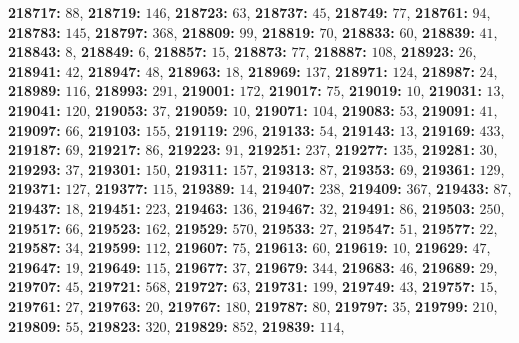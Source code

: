 \textsf{\bfseries 218717:} $88$, \textsf{\bfseries 218719:} $146$, \textsf{\bfseries 218723:} $63$, \textsf{\bfseries 218737:} $45$, \textsf{\bfseries 218749:} $77$, \textsf{\bfseries 218761:} $94$, \textsf{\bfseries 218783:} $145$, \textsf{\bfseries 218797:} $368$, \textsf{\bfseries 218809:} $99$, \textsf{\bfseries 218819:} $70$, \textsf{\bfseries 218833:} $60$, \textsf{\bfseries 218839:} $41$, \textsf{\bfseries 218843:} $8$, \textsf{\bfseries 218849:} $6$, \textsf{\bfseries 218857:} $15$, \textsf{\bfseries 218873:} $77$, \textsf{\bfseries 218887:} $108$, \textsf{\bfseries 218923:} $26$, \textsf{\bfseries 218941:} $42$, \textsf{\bfseries 218947:} $48$, \textsf{\bfseries 218963:} $18$, \textsf{\bfseries 218969:} $137$, \textsf{\bfseries 218971:} $124$, \textsf{\bfseries 218987:} $24$, \textsf{\bfseries 218989:} $116$, \textsf{\bfseries 218993:} $291$, \textsf{\bfseries 219001:} $172$, \textsf{\bfseries 219017:} $75$, \textsf{\bfseries 219019:} $10$, \textsf{\bfseries 219031:} $13$, \textsf{\bfseries 219041:} $120$, \textsf{\bfseries 219053:} $37$, \textsf{\bfseries 219059:} $10$, \textsf{\bfseries 219071:} $104$, \textsf{\bfseries 219083:} $53$, \textsf{\bfseries 219091:} $41$, \textsf{\bfseries 219097:} $66$, \textsf{\bfseries 219103:} $155$, \textsf{\bfseries 219119:} $296$, \textsf{\bfseries 219133:} $54$, \textsf{\bfseries 219143:} $13$, \textsf{\bfseries 219169:} $433$, \textsf{\bfseries 219187:} $69$, \textsf{\bfseries 219217:} $86$, \textsf{\bfseries 219223:} $91$, \textsf{\bfseries 219251:} $237$, \textsf{\bfseries 219277:} $135$, \textsf{\bfseries 219281:} $30$, \textsf{\bfseries 219293:} $37$, \textsf{\bfseries 219301:} $150$, \textsf{\bfseries 219311:} $157$, \textsf{\bfseries 219313:} $87$, \textsf{\bfseries 219353:} $69$, \textsf{\bfseries 219361:} $129$, \textsf{\bfseries 219371:} $127$, \textsf{\bfseries 219377:} $115$, \textsf{\bfseries 219389:} $14$, \textsf{\bfseries 219407:} $238$, \textsf{\bfseries 219409:} $367$, \textsf{\bfseries 219433:} $87$, \textsf{\bfseries 219437:} $18$, \textsf{\bfseries 219451:} $223$, \textsf{\bfseries 219463:} $136$, \textsf{\bfseries 219467:} $32$, \textsf{\bfseries 219491:} $86$, \textsf{\bfseries 219503:} $250$, \textsf{\bfseries 219517:} $66$, \textsf{\bfseries 219523:} $162$, \textsf{\bfseries 219529:} $570$, \textsf{\bfseries 219533:} $27$, \textsf{\bfseries 219547:} $51$, \textsf{\bfseries 219577:} $22$, \textsf{\bfseries 219587:} $34$, \textsf{\bfseries 219599:} $112$, \textsf{\bfseries 219607:} $75$, \textsf{\bfseries 219613:} $60$, \textsf{\bfseries 219619:} $10$, \textsf{\bfseries 219629:} $47$, \textsf{\bfseries 219647:} $19$, \textsf{\bfseries 219649:} $115$, \textsf{\bfseries 219677:} $37$, \textsf{\bfseries 219679:} $344$, \textsf{\bfseries 219683:} $46$, \textsf{\bfseries 219689:} $29$, \textsf{\bfseries 219707:} $45$, \textsf{\bfseries 219721:} $568$, \textsf{\bfseries 219727:} $63$, \textsf{\bfseries 219731:} $199$, \textsf{\bfseries 219749:} $43$, \textsf{\bfseries 219757:} $15$, \textsf{\bfseries 219761:} $27$, \textsf{\bfseries 219763:} $20$, \textsf{\bfseries 219767:} $180$, \textsf{\bfseries 219787:} $80$, \textsf{\bfseries 219797:} $35$, \textsf{\bfseries 219799:} $210$, \textsf{\bfseries 219809:} $55$, \textsf{\bfseries 219823:} $320$, \textsf{\bfseries 219829:} $852$, \textsf{\bfseries 219839:} $114$, 
